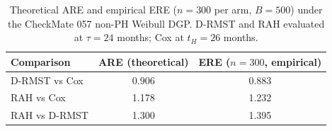 \begin{table}[ht]
\centering
\caption{Theoretical ARE and empirical ERE ($n=300$ per arm, $B=500$)
  under the CheckMate 057 non-PH Weibull DGP.
  D-RMST and RAH evaluated at $\tau=24$ months; Cox at $t_H=26$ months.}
\label{tab:cm057-are-ere}
\medskip
\begin{tabular}{lcc}
\toprule
Comparison & ARE (theoretical) & ERE ($n=300$, empirical) \\
\midrule
D-RMST vs Cox & 0.906 & 0.883 \\
RAH vs Cox & 1.178 & 1.232 \\
RAH vs D-RMST & 1.300 & 1.395 \\
\bottomrule
\end{tabular}
\end{table}

